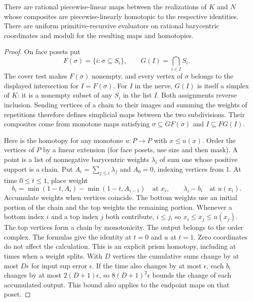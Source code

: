 \begin{theorem}\label{thm:nerve-pl}
There are rational piecewise-linear maps between the realizations of $K$
and $N$ whose composites are piecewise-linearly homotopic to the respective
identities. There are uniform primitive-recursive evaluators on rational
barycentric coordinates and moduli for the resulting maps and homotopies.
\end{theorem}
\begin{proof}
On face posets put
\[
 F(\sigma)=\{i:\sigma\subseteq S_i\},\qquad
 G(I)=\bigcap_{i\in I}S_i .
\]
The cover test makes $F(\sigma)$ nonempty, and every vertex of $\sigma$
belongs to the displayed intersection for $I=F(\sigma)$. For $I$ in
the nerve, $G(I)$ is itself a simplex of $K$: it is a nonempty subset
of any $S_i$ in the list $I$. Both assignments reverse inclusion. Sending
vertices of a chain to their images and summing the weights of repetitions
therefore defines simplicial maps between the two subdivisions. Their
composites come from monotone maps satisfying
$\sigma\subseteq GF(\sigma)$ and $I\subseteq FG(I)$.

Here is the homotopy for any monotone $u:P\to P$ with $x\le u(x)$.
Order the vertices of $P$ by a linear extension (for face posets, use size
and then mask). A point is a list of nonnegative barycentric weights
$\lambda_i$ of sum one whose positive support is a chain. Put
$A_i=\sum_{j\le i}\lambda_j$ and $A_0=0$, indexing vertices from 1.
At time $0\le t\le1$, place weight
\[
 b_i=\min(1-t,A_i)-\min(1-t,A_{i-1})
 \quad\text{at }x_i,\qquad
 \lambda_i-b_i\quad\text{at }u(x_i).
\]
Accumulate weights when vertices coincide. The bottom weights use an initial
portion of the chain and the top weights the remaining portion. Whenever
a bottom index $i$ and a top index $j$ both contribute, $i\le j$,
so $x_i\le x_j\le u(x_j)$. The top vertices form a chain by monotonicity.
The output belongs to the order complex. The formulas give the identity at
$t=0$ and $u$ at $t=1$. Zero coordinates do not affect the calculation.
This is an explicit prism homotopy, including at times when a weight splits.
With $D$ vertices the cumulative sums change by at most $D\epsilon$ for
input sup error $\epsilon$. If the time also changes by at most $\epsilon$,
each $b_i$ changes by at most $2(D+1)\epsilon$, so
$8(D+1)^2\epsilon$ bounds the change of each accumulated output. This
bound also applies to the endpoint maps on that poset.


\end{proof}
